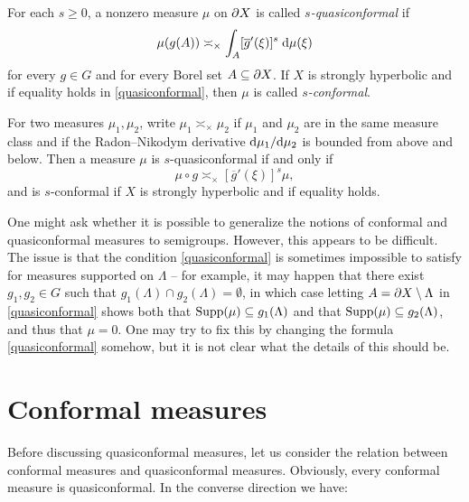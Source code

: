\begin{definition}
\label{definitionquasiconformal}
For each $s\geq 0$, a nonzero measure $\mu$ on $\partial X$ is called \emph{$s$-quasiconformal} if
\begin{equation}
\label{quasiconformal}
\mu(g(A)) \asymp_\times \int_A [\overline g'(\xi)]^s\;\mathrm{d}\mu(\xi)
\end{equation}
for every $g\in G$ and for every Borel set $A\subseteq\partial X$. If $X$ is strongly hyperbolic and if equality holds in \eqref{quasiconformal}, then $\mu$ is called \emph{$s$-conformal}.
\end{definition}
\begin{remark}
\label{remarkmuasymp}
For two measures $\mu_1,\mu_2$, write $\mu_1\asymp_\times \mu_2$ if $\mu_1$ and $\mu_2$ are in the same measure class and if the Radon--Nikodym derivative $\mathrm{d} \mu_1/\mathrm{d} \mu_2$ is bounded from above and below. Then a measure $\mu$ is $s$-quasiconformal if and only if
\[
\mu\circ g \asymp_\times [\overline g'(\xi)]^s\mu,
\]
and is $s$-conformal if $X$ is strongly hyperbolic and if equality holds.
\end{remark}

\begin{remark}
One might ask whether it is possible to generalize the notions of conformal and quasiconformal measures to semigroups. However, this appears to be difficult. The issue is that the condition \eqref{quasiconformal} is sometimes impossible to satisfy for measures supported on $\Lambda$ -- for example, it may happen that there exist $g_1,g_2\in G$ such that $g_1(\Lambda)\cap g_2(\Lambda) = \emptyset$, in which case letting $A = \partial X\setminus\Lambda$ in \eqref{quasiconformal} shows both that $\operatorname{Supp}(\mu)\subseteq g_1(\Lambda)$ and that $\operatorname{Supp}(\mu)\subseteq g_2(\Lambda)$, and thus that $\mu = 0$. One may try to fix this by changing the formula \eqref{quasiconformal} somehow, but it is not clear what the details of this should be.%
\end{remark}




\section{Conformal measures}
Before discussing quasiconformal measures, let us consider the relation between conformal measures and quasiconformal measures. Obviously, every conformal measure is quasiconformal. In the converse direction we have:

